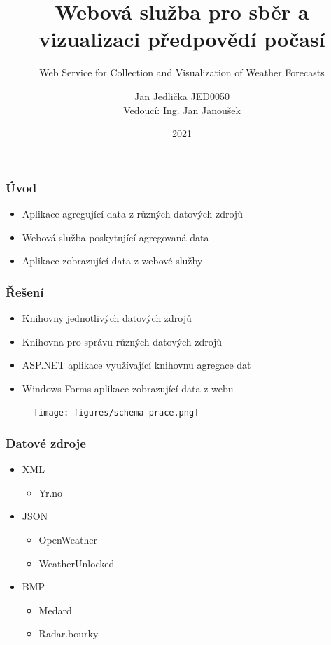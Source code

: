 \documentclass{beamer}
\title[Bakalářská práce]{Webová služba pro sběr a vizualizaci předpovědí počasí}
\subtitle{Web Service for Collection and Visualization of Weather Forecasts}
\author[Jan Jedlička JED0050]{Jan Jedlička JED0050 \\ {\small Vedoucí: Ing. Jan Janoušek}}
\institute[]{FEI, VŠB-TUO}
\date{2021}
\begin{document}
	
	\frame{\titlepage}
	
	\begin{frame}
		\frametitle{Úvod}
		
		\begin{itemize}
			\item Aplikace agregující data z různých datových zdrojů
			\item Webová služba poskytující agregovaná data
			\item Aplikace zobrazující data z webové služby
		\end{itemize}
		
	\end{frame}

	\begin{frame}
		\frametitle{Řešení}
		
		\begin{itemize}
			\item Knihovny jednotlivých datových zdrojů
			\item Knihovna pro správu různých datových zdrojů
			\item ASP.NET aplikace využívající knihovnu agregace dat
			\item Windows Forms aplikace zobrazující data z webu
		\end{itemize}
		
		\begin{figure}
			
			\texttt{[image: figures/schema prace.png]}

		\end{figure}
		
	\end{frame}

	\begin{frame}
		\frametitle{Datové zdroje}
		
		\begin{itemize}
			\item XML
			\begin{itemize}
				\item Yr.no
			\end{itemize}
			\item JSON
			\begin{itemize}
				\item OpenWeather
				\item WeatherUnlocked
			\end{itemize}
			\item BMP
			\begin{itemize}
				\item Medard
				\item Radar.bourky
			\end{itemize}
		\end{itemize}
	\end{frame}
\end{document}
